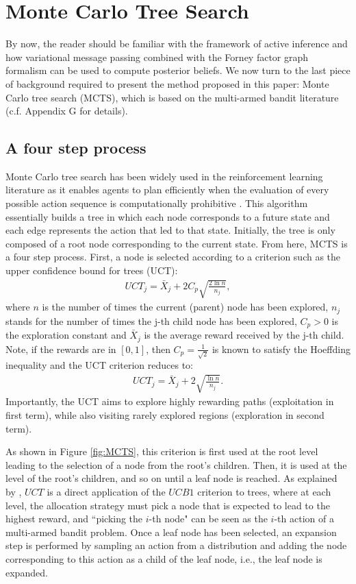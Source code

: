 \documentclass[twoside,11pt]{article}
\begin{document}
\section{Monte Carlo Tree Search} \label{sec:MCTS}

By now, the reader should be familiar with the framework of active inference and how variational message passing combined with the Forney factor graph formalism can be used to compute posterior beliefs. We now turn to the last piece of background required to present the method proposed in this paper: Monte Carlo tree search (MCTS), which is based on the multi-armed bandit literature (c.f. Appendix G for details).

\subsection{A four step process}

Monte Carlo tree search has been widely used in the reinforcement learning literature as it enables agents to plan efficiently when the evaluation of every possible action sequence is computationally prohibitive \citep{Go,6145622,MuZero,DeepAIwithMCMC}. This algorithm essentially builds a tree in which each node corresponds to a future state and each edge represents the action that led to that state. Initially, the tree is only composed of a root node corresponding to the current state. From here, MCTS is a four step process. First, a node is selected according to a criterion such as the upper confidence bound for trees (UCT):
\begin{align}
UCT_j = \bar{X}_j + 2 C_p \sqrt{\frac{2\ln n}{n_j}},
\end{align}
where $n$ is the number of times the current (parent) node has been explored, $n_j$ stands for the number of times the j-th child node has been explored, $C_p > 0$ is the exploration constant and $\bar{X}_j$ is the average reward received by the j-th child. Note, if the rewards are in $[0,1]$, then $C_p = \frac{1}{\sqrt{2}}$ is known to satisfy the Hoeffding inequality \citep{6145622} and the UCT criterion reduces to:
\begin{align}
UCT_j = \bar{X}_j + 2 \sqrt{\frac{\ln n}{n_j}}.
\end{align}
Importantly, the UCT aims to explore highly rewarding paths (exploitation in first term), while also visiting rarely explored regions (exploration in second term). 

As shown in Figure \ref{fig:MCTS}, this criterion is first used at the root level leading to the selection of a node from the root's children. Then, it is used at the level of the root's children, and so on until a leaf node is reached. As explained by \citet{10.1007/11871842_29}, $UCT$ is a direct application of the $UCB1$ criterion to trees, where at each level, the allocation strategy must pick a node that is expected to lead to the highest reward, and ``picking the $i$-th node" can be seen as the $i$-th action of a multi-armed bandit problem. Once a leaf node has been selected, an expansion step is performed by sampling an action from a distribution and adding the node corresponding to this action as a child of the leaf node, i.e., the leaf node is expanded.
\end{document}
